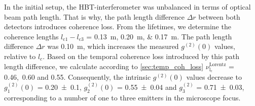 
%


In the initial setup, the \ac{HBT}-interferometer was unbalanced in terms of optical beam path length. That is why, the path length difference $\Delta r$ between both detectors introduces coherence loss. From the lifetimes, we determine the coherence lengths $l_\mathrm{c1}-l_\mathrm{c3}$ = \SIlist[list-units = brackets]{0.13;0.20;0.17}{\m}. The path length difference $\Delta r$ was \SI{0.10}{\m}, which increases the measured $g^{(2)}(0)$ values, relative to $l_{c}$. Based on the temporal coherence loss introduced by this path length difference, we calculate according to \cref{sec:temp_coh_loss} $\nu_\mathrm{l_c}^\mathrm{Lorentz}$ = 0.46,~0.60 and 0.55. Consequently, the intrinsic $g^{(2)}(0)$ values decrease to $g^{(2)}_{1}(0)$ = \num{0.20\pm0.1}, $g^{(2)}_{2}(0)$ = \num{0.55\pm0.04} and $g^{(2)}_{3}$ = \num{0.71\pm0.03}, corresponding to a number of one to three emitters in the microscope focus.

